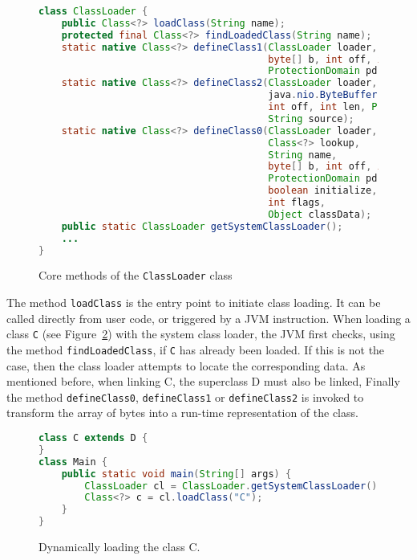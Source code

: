 \begin{figure}[ht]
    \centering
\begin{lstlisting}[language=Java]
class ClassLoader {
    public Class<?> loadClass(String name);
    protected final Class<?> findLoadedClass(String name);
    static native Class<?> defineClass1(ClassLoader loader, String name, 
                                        byte[] b, int off, int len,
                                        ProtectionDomain pd, String source);
    static native Class<?> defineClass2(ClassLoader loader, String name, 
                                        java.nio.ByteBuffer b,
                                        int off, int len, ProtectionDomain pd,
                                        String source);
    static native Class<?> defineClass0(ClassLoader loader,
                                        Class<?> lookup,
                                        String name,
                                        byte[] b, int off, int len,
                                        ProtectionDomain pd,
                                        boolean initialize,
                                        int flags,
                                        Object classData);
    public static ClassLoader getSystemClassLoader();
    ...
}
\end{lstlisting}
    \caption{Core methods of the \texttt{ClassLoader} class}
    \label{fig:classloader}
\end{figure}


The method \verb|loadClass| is the entry point to initiate class loading. It can be called directly from user code, or triggered by a JVM instruction.
When loading a class \verb|C| (see Figure~\ref{fig:class_C}) with the system class loader, the JVM first checks, using the method \verb|findLoadedClass|, if \verb|C| has already been loaded. If this is not the case, then the class loader attempts to locate the corresponding data. As mentioned before, when linking C, the superclass D must also be linked, Finally the method \verb|defineClass0|, \verb|defineClass1| or \verb|defineClass2| is invoked to transform the array of bytes into a run-time representation of the class.

\begin{figure}[h]
    \centering
\begin{lstlisting}[language=Java]
class C extends D {
}
class Main {
    public static void main(String[] args) {
        ClassLoader cl = ClassLoader.getSystemClassLoader();
        Class<?> c = cl.loadClass("C");
    }
}
\end{lstlisting}
    \caption{Dynamically loading the class C.}
    \label{fig:class_C}
\end{figure}

